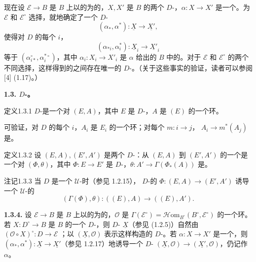 现在设 $\mathscr E\to B$ 是 $B$ 上以的为的，$X,X'$ 是 $B$ 的两个 $D$-，$\alpha:X\to X'$ 是一个。为 $\mathscr E$ 和 $\mathscr E^\circ$ 选择，就地确定了一个 $D$-
\[
(\alpha_*,\alpha^*):\underline X\longrightarrow\underline{X'},
\]
使得对 $D$ 的每个 $i$，
\[
(\alpha_{*i},\alpha_i^*):\underline X_i\longrightarrow\underline{X'}_i
\]
等于 $(\alpha_{i*}^\circ,\alpha_i^{*\circ})$，其中 $\alpha_i:X_i\to X'_i$ 是 $\alpha$ 给出的 $B$ 中的。对于 $\mathscr E$ 和 $\mathscr E^\circ$ 的两个不同选择，这样得到的之间存在唯一的 $D$-。（关于这些事实的验证，读者可以参阅 [4] (1.17)。）

\textbf{1.3.  $D$-。}
\begin{SGAresult}{定义}{1.3.1}
 $D$-是一个对 $(E,A)$，其中 $E$ 是 $D$-，$A$ 是 $(E)$ 的一个环。
\end{SGAresult}
可验证，对 $D$ 的每个 $i$，$A_i$ 是 $E_i$ 的一个环；对每个 $m:i\to j$， $A_i\to m^*(A_j)$ 是。

\begin{SGAresult}{定义}{1.3.2}
设 $(E,A),(E',A')$ 是两个 $D$-：从 $(E,A)$ 到 $(E',A')$ 的一个是一个对 $(\Phi,\theta)$，其中 $\Phi:E\to E'$ 是 $D$-，$\theta:A'\to\Gamma(\Phi_*(A))$ 是。
\end{SGAresult}
\begin{SGAresult}{注记}{1.3.3}
当 $D$ 是一个 $\mathcal U$-时（参见 1.2.15）， $D$-的 $\Phi:(E,A)\to(E',A')$ 诱导一个 $\mathcal U$-的
\[
(\Gamma(\Phi),\theta):((E),A)\longrightarrow((E),A').
\]
\end{SGAresult}
\textbf{1.3.4.} 设 $\mathscr E\to B$ 是 $B$ 上以的为的，$\mathcal O$ 是 $\Gamma(\mathscr E^\circ)=\mathscr{H}\mathrm{om}_{B^\circ}(B^\circ,\mathscr E^\circ)$ 的一个环。若 $X:D^\circ\to B$ 是 $B$ 的一个 $D$-，则 $D$- $\underline X$（参见 (1.2.5)）自然由 $(\mathcal O\circ X)^\circ:D\to\mathscr E$ ；以 $(\underline X,\mathcal O)$ 表示这样构造的 $D$-。若 $\alpha:X\to X'$ 是一个，则 $(\alpha_*,\alpha^*):\underline X\to\underline{X'}$（参见 1.2.17）地诱导一个 $D$- $(\underline X,\mathcal O)\to(\underline{X'},\mathcal O)$，仍记作 $\alpha$。

